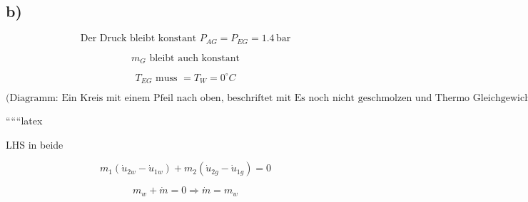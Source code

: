 

\subsection*{b)}

\[
\text{Der Druck bleibt konstant } P_{AG} = P_{EG} = 1.4 \, \text{bar}
\]

\[
m_G \text{ bleibt auch konstant}
\]

\[
T_{EG} \text{ muss } = T_W = 0^\circ C
\]

\[
\text{(Diagramm: Ein Kreis mit einem Pfeil nach oben, beschriftet mit } \text{Es noch nicht geschmolzen} \text{ und } \text{Thermo Gleichgewicht} \text{)}
\]

``````latex


\noindent
LHS in beide

\[
m_1 (\dot{u}_{2w} - \dot{u}_{1w}) + m_2 (\dot{u}_{2g} - \dot{u}_{1g}) = 0
\]

\[
m_w + \dot{m} = 0 \Rightarrow \dot{m} = m_w
\]

\noindent